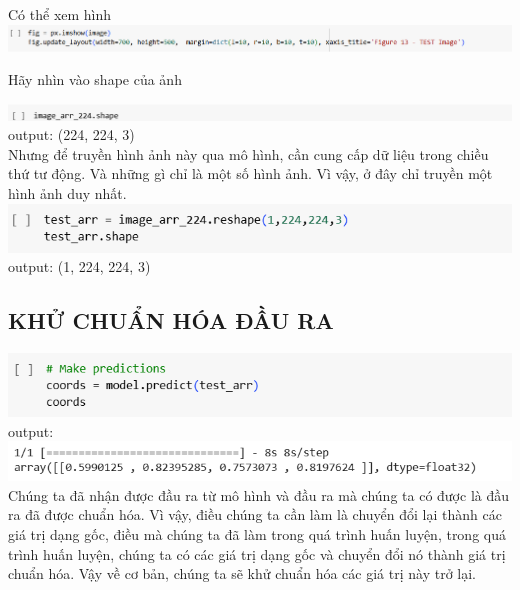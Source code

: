 \documentclass{article}
\begin{document}
Có thể xem hình  \\

\includegraphics[width= 17cm]{img/img1/9.png}

Hãy nhìn vào shape của ảnh

\includegraphics[width = 17cm]{img/img1/10.png}\\

output: (224, 224, 3)\\

Nhưng để truyền hình ảnh này qua mô hình, cần cung cấp dữ liệu trong chiều thứ tư động. Và những gì chỉ là một số hình ảnh. Vì vậy, ở đây chỉ truyền một hình ảnh duy nhất.\\

\includegraphics[width= 17cm]{img/img1/11.png}\\

output: (1, 224, 224, 3)\\
\subsection{KHỬ CHUẨN HÓA ĐẦU RA}
\includegraphics[width= 17cm]{img/img1/12.png}\\

output:\\
\includegraphics[width = 17cm]{img/img1/13.png}\\

Chúng ta đã nhận được đầu ra từ mô hình và đầu ra mà chúng ta có được là đầu ra đã được chuẩn hóa. Vì vậy, điều chúng ta cần làm là chuyển đổi lại thành các giá trị dạng gốc, điều mà chúng ta đã làm trong quá trình huấn luyện, trong quá trình huấn luyện, chúng ta có các giá trị dạng gốc và chuyển đổi nó thành giá trị chuẩn hóa. Vậy về cơ bản, chúng ta sẽ khử chuẩn hóa các giá trị này trở lại.
\end{document}
